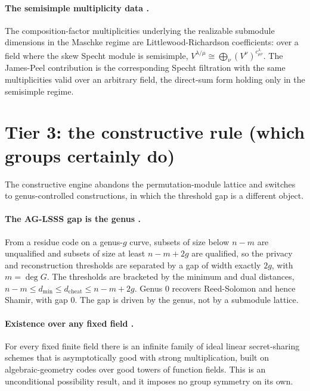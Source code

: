 \documentclass[11pt]{article}
\begin{document}
\paragraph{The semisimple multiplicity data \cite{jamespeel1979,james1978}.}
The composition-factor multiplicities underlying the realizable submodule dimensions in the
Maschke regime are Littlewood-Richardson coefficients: over a field where the skew Specht
module is semisimple, $V^{\lambda/\mu} \cong \bigoplus_\nu (V^\nu)^{c^\lambda_{\mu\nu}}$.
The James-Peel contribution is the corresponding Specht filtration with the same
multiplicities valid over an arbitrary field, the direct-sum form holding only in the
semisimple regime.

\section{Tier 3: the constructive rule (which groups certainly do)}

The constructive engine abandons the permutation-module lattice and switches to
genus-controlled constructions, in which the threshold gap is a different object.

\paragraph{The AG-LSSS gap is the genus \cite{chen2006aglsss}.}
From a residue code on a genus-$g$ curve, subsets of size below $n-m$ are unqualified and
subsets of size at least $n-m+2g$ are qualified, so the privacy and reconstruction
thresholds are separated by a gap of width exactly $2g$, with $m = \deg G$. The thresholds
are bracketed by the minimum and dual distances,
$n-m \leq d_{\min} \leq d_{\mathrm{cheat}} \leq n-m+2g$. Genus $0$ recovers Reed-Solomon and
hence Shamir, with gap $0$. The gap is driven by the genus, not by a submodule lattice.

\paragraph{Existence over any fixed field \cite{cccx2009}.}
For every fixed finite field there is an infinite family of ideal linear secret-sharing
schemes that is asymptotically good with strong multiplication, built on algebraic-geometry
codes over good towers of function fields. This is an unconditional possibility result, and
it imposes no group symmetry on its own.
\end{document}
